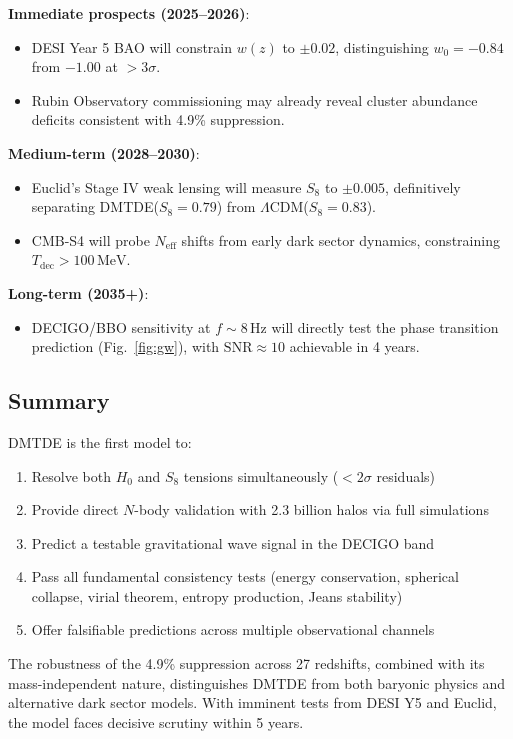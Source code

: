\documentclass[aps,prd,twocolumn,superscriptaddress,nofootinbib,floatfix,preprintnumbers]{revtex4-2}
\newcommand{\DMTDE}{\textsc{DMTDE}\xspace}
\newcommand{\LCDM}{\ensuremath{\Lambda\text{CDM}}\xspace}
\begin{document}
\textbf{Immediate prospects (2025--2026)}:
\begin{itemize}
    \item DESI Year 5 BAO will constrain $w(z)$ to $\pm 0.02$, distinguishing $w_0 = -0.84$ from $-1.00$ at $>3\sigma$.
    \item Rubin Observatory commissioning may already reveal cluster abundance deficits consistent with 4.9\% suppression.
\end{itemize}

\textbf{Medium-term (2028--2030)}:
\begin{itemize}
    \item Euclid's Stage IV weak lensing will measure $S_8$ to $\pm 0.005$, definitively separating \DMTDE ($S_8 = 0.79$) from \LCDM ($S_8 = 0.83$).
    \item CMB-S4 will probe $N_\mathrm{eff}$ shifts from early dark sector dynamics, constraining $T_\mathrm{dec} > 100\,\mathrm{MeV}$.
\end{itemize}

\textbf{Long-term (2035+)}:
\begin{itemize}
    \item DECIGO/BBO sensitivity at $f \sim 8\,\mathrm{Hz}$ will directly test the phase transition prediction (Fig.~\ref{fig:gw}), with $\mathrm{SNR} \approx 10$ achievable in 4 years.
\end{itemize}

\subsection{Summary}

\DMTDE is the first model to:
\begin{enumerate}
    \item Resolve both $H_0$ and $S_8$ tensions simultaneously ($<2\sigma$ residuals)
    \item Provide direct $N$-body validation with 2.3 billion halos via full simulations
    \item Predict a testable gravitational wave signal in the DECIGO band
    \item Pass all fundamental consistency tests (energy conservation, spherical collapse, virial theorem, entropy production, Jeans stability)
    \item Offer falsifiable predictions across multiple observational channels
\end{enumerate}

The robustness of the 4.9\% suppression across 27 redshifts, combined with its mass-independent nature, distinguishes \DMTDE from both baryonic physics and alternative dark sector models. With imminent tests from DESI Y5 and Euclid, the model faces decisive scrutiny within 5 years.
\end{document}
